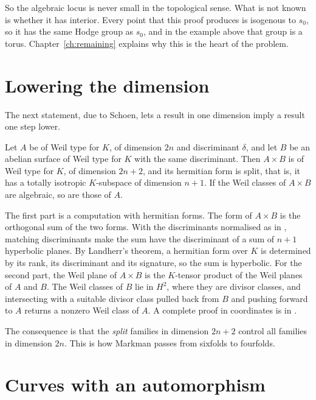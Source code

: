 So the algebraic locus is never small in the topological sense. What is not
known is whether it has interior. Every point that this proof produces is
isogenous to $s_{0}$, so it has the same Hodge group as $s_{0}$, and
in the example above that group is a torus. Chapter~\ref{ch:remaining}
explains why this is the heart of the problem.

\section{Lowering the dimension}

The next statement, due to Schoen, lets a result in one dimension imply a
result one step lower.

\begin{proposition}\label{prop:lower}
Let $A$ be of Weil type for $K$, of dimension $2n$ and discriminant
$\delta$, and let $B$ be an abelian surface of Weil type for $K$ with the
same discriminant. Then $A\times B$ is of Weil type for $K$, of dimension
$2n+2$, and its hermitian form is split, that is, it has a totally
isotropic $K$-subspace of dimension $n+1$. If the Weil classes of $A\times B$
are algebraic, so are those of $A$.
\end{proposition}

The first part is a computation with hermitian forms. The form of
$A\times B$ is the orthogonal sum of the two forms. With the discriminants
normalised as in \cite{BhH8}, matching discriminants make the sum have the
discriminant of a sum of $n+1$ hyperbolic planes. By Landherr's theorem, a
hermitian form over $K$ is determined by its rank, its discriminant and its
signature, so the sum is hyperbolic. For the
second part, the Weil plane of $A\times B$ is the $K$-tensor product of
the Weil planes of $A$ and $B$. The Weil classes of $B$ lie in $H^{2}$, where
they are divisor classes, and intersecting with a suitable divisor class
pulled back from $B$ and pushing forward to $A$ returns a nonzero Weil class
of $A$. A complete proof in coordinates is in \cite{BhH8}.

The consequence is that the \emph{split} families in dimension $2n+2$
control all families in dimension $2n$. This is how Markman passes from
sixfolds to fourfolds.

\section{Curves with an automorphism}\label{sec:schoen}

